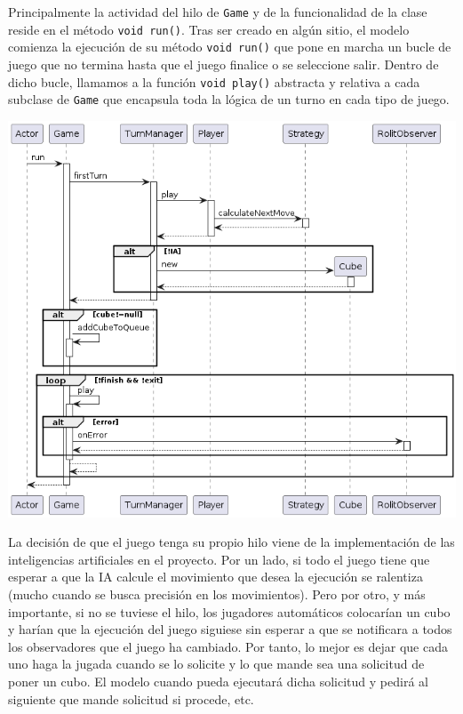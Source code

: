 \documentclass[../DocumentoOficial.tex]{subfiles}
\begin{document}
Principalmente la actividad del hilo de \texttt{Game} y de la funcionalidad de la clase reside en el método \texttt{void run()}. Tras ser creado en algún sitio, el modelo comienza la ejecución de su método \texttt{void run()} que pone en marcha un bucle de juego que no termina hasta que el juego finalice o se seleccione salir. Dentro de dicho bucle, llamamos a la función \texttt{void play()} abstracta y relativa a cada subclase de \texttt{Game} que encapsula toda la lógica de un turno en cada tipo de juego.
\begin{center}
\includegraphics[scale=0.5]{GameRun_final_seq}
\end{center}

La decisión de que el juego tenga su propio hilo viene de la implementación de las inteligencias artificiales en el proyecto. Por un lado, si todo el juego tiene que esperar a que la IA calcule el movimiento que desea la ejecución se ralentiza (mucho cuando se busca precisión en los movimientos). Pero por otro, y más importante, si no se tuviese el hilo, los jugadores automáticos colocarían un cubo y harían que la ejecución del juego siguiese sin esperar a que se notificara a todos los observadores que el juego ha cambiado. Por tanto, lo mejor es dejar que cada uno haga la jugada cuando se lo solicite y lo que mande sea una solicitud de poner un cubo. El modelo cuando pueda ejecutará dicha solicitud y pedirá al siguiente que mande solicitud si procede, etc.
\end{document}
